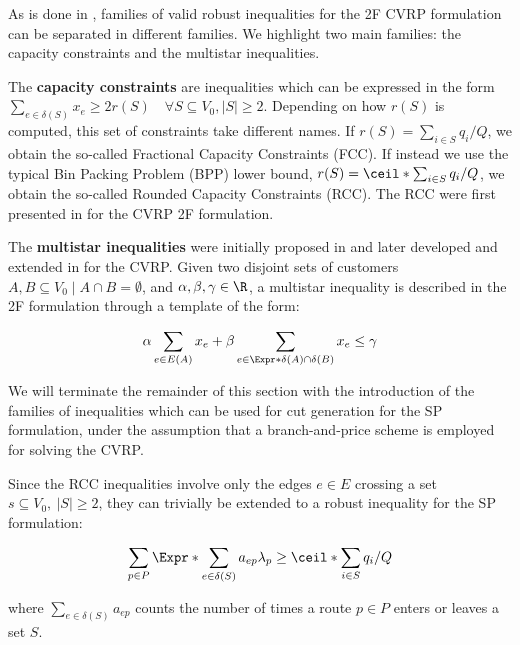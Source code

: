 As is done in \textcite{toth2014},
families of valid robust inequalities for the 2F CVRP formulation
can be separated in different families.
We highlight two main families: the capacity constraints and the multistar inequalities.

The \textbf{capacity constraints} are inequalities which can be expressed in the form
$\sum_{e \in \delta(S)} x_e \ge 2 r(S) \quad \forall S \subseteq V_0, |S| \ge 2$.
Depending on how $r(S)$ is computed, this set of constraints take different names.
If $r(S) = \sum_{i \in S} q_i / Q$, we obtain the so-called Fractional Capacity Constraints (FCC).
If instead we use the typical Bin Packing Problem (BPP) lower bound, $r(S) = \ceil*{\sum_{i \in S} q_i / Q}$, we obtain the so-called Rounded Capacity Constraints (RCC).
The RCC were first presented in \textcite{laporte1983} for the CVRP 2F formulation.

The \textbf{multistar inequalities} were initially proposed in \textcite{araque1990, gouveia1995}
and later developed and extended in \textcite{letchford2002} for the CVRP.
Given two disjoint sets of customers $A, B \subseteq V_0 \mid A \cap B = \emptyset$,
and $\alpha, \beta, \gamma \in \R$,
a multistar inequality is described in the 2F formulation through a
template of the form:

\begin{equation}
	\alpha \sum_{e \in E(A)} x_e + \beta \sum_{e \in \Expr*{\delta(A) \cap \delta(B)}} x_e \le \gamma
\end{equation}


\medskip


We will terminate the remainder of this section with the introduction
of the families of inequalities which can be used for cut generation
for the SP formulation, under the assumption that a branch-and-price scheme is employed
for solving the CVRP.

Since the RCC inequalities involve only the edges $e \in E$ crossing a set $s \subseteq V_0,\ |S| \ge 2$,
they can trivially be extended to a robust inequality for the SP formulation:

\begin{equation}
    \sum_{p \in P} \Expr*{\sum_{e \in \delta(S)} a_{ep}} \lambda_p \ge \ceil*{\sum_{i \in S} q_i / Q}
\end{equation}


where $\sum_{e \in \delta(S)} a_{ep}$ counts the number of times a route $p \in P$
enters or leaves a set $S$.


\medskip


